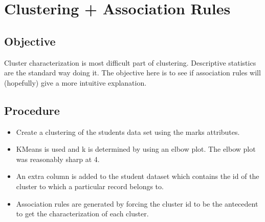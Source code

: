 \chapter{Clustering + Association Rules}
\label{chap:experiment3}
\section*{Objective}
Cluster characterization is most difficult part of clustering. Descriptive statistics are the standard way doing it. The objective here is to see if association rules will (hopefully) give a more intuitive explanation.

\section*{Procedure}
\begin{itemize}
\item Create a clustering of the students data set using the marks attributes.
\item KMeans is used and k is determined by using an elbow plot. The elbow plot was reasonably sharp at 4.
\item An extra column is added to the student dataset which contains the id of the cluster to which a particular record belongs to.
\item Association rules are generated by forcing the cluster id to be the antecedent to get the characterization of each cluster.
\end{itemize}

